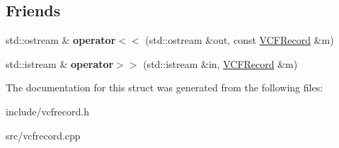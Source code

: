 \subsection*{Friends}
\begin{DoxyCompactItemize}
\item 
\mbox{\label{structVCFRecord_adebe668cf2281b4b9c10e50032adedba}} 
std\+::ostream \& {\bfseries operator$<$$<$} (std\+::ostream \&out, const \hyperlink{structVCFRecord}{V\+C\+F\+Record} \&m)
\item 
\mbox{\label{structVCFRecord_a446bcf6252d8ff2d3e2e0823114ff821}} 
std\+::istream \& {\bfseries operator$>$$>$} (std\+::istream \&in, \hyperlink{structVCFRecord}{V\+C\+F\+Record} \&m)
\end{DoxyCompactItemize}


The documentation for this struct was generated from the following files\+:\begin{DoxyCompactItemize}
\item 
include/vcfrecord.\+h\item 
src/vcfrecord.\+cpp\end{DoxyCompactItemize}
